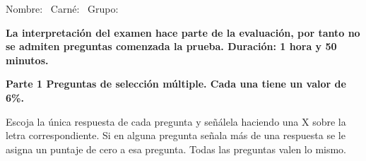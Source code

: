 \documentclass[11pt]{article}
\begin{document}
\examheader

\vspace{2pt}
\noindent Nombre: \dotfill\ Carné: \dotfill\ Grupo: \dotfill

\vspace{8pt}
\noindent\textbf{La interpretación del examen hace parte de la evaluación, por tanto no se admiten preguntas comenzada la prueba. Duración: 1 hora y 50 minutos.}

\vspace{10pt}
\noindent\textbf{Parte 1 Preguntas de selección múltiple. Cada una tiene un valor de 6\%.}

\noindent Escoja la única respuesta de cada pregunta y señálela haciendo una X sobre la letra correspondiente. Si en alguna pregunta señala más de una respuesta se le asigna un puntaje de cero a esa pregunta. Todas las preguntas valen lo mismo.
\end{document}
